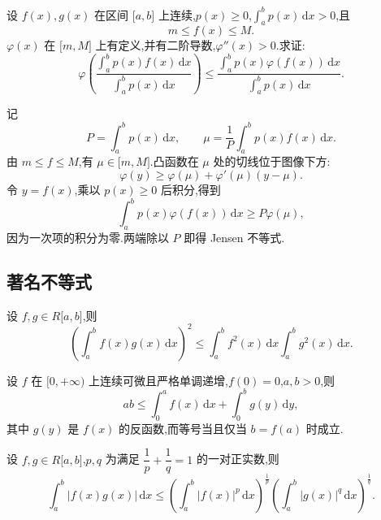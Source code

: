 \begin{example}[\markstar]
    设 $f(x),g(x)$ 在区间 $\lbrack a,b\rbrack$ 上连续,$p(x)\geq0$,$\displaystyle\int_a^bp(x)\,\mathrm{d}x>0$,且
    \[
        m\leq f(x)\leq M.
    \]
    $\varphi(x)$ 在 $\lbrack m,M\rbrack$ 上有定义,并有二阶导数,$\varphi''(x)>0$.求证:
    \[
        \varphi\left(
        \dfrac{\displaystyle\int_a^bp(x)f(x)\,\mathrm{d}x}
            {\displaystyle\int_a^bp(x)\,\mathrm{d}x}
        \right)
        \leq
        \dfrac{\displaystyle\int_a^bp(x)\varphi(f(x))\,\mathrm{d}x}
        {\displaystyle\int_a^bp(x)\,\mathrm{d}x}.
    \]
\end{example}
\exampleblank

\begin{solution}
    记
    \[
        P=\int_a^bp(x)\,\mathrm{d}x,
        \qquad
        \mu=\dfrac{1}{P}\int_a^bp(x)f(x)\,\mathrm{d}x.
    \]
    由 $m\leq f\leq M$,有 $\mu\in\lbrack m,M\rbrack$.凸函数在 $\mu$ 处的切线位于图像下方:
    \[
        \varphi(y)\geq\varphi(\mu)+\varphi'(\mu)(y-\mu).
    \]
    令 $y=f(x)$,乘以 $p(x)\geq0$ 后积分,得到
    \[
        \displaystyle\int_a^bp(x)\varphi(f(x))\,\mathrm{d}x
        \geq P\varphi(\mu),
    \]
    因为一次项的积分为零.两端除以 $P$ 即得 Jensen 不等式.
\end{solution}



\subsection{著名不等式}

\begin{theorem}
    设 $f,g\in R\lbrack a,b\rbrack$,则
    \[
        \left(\int_a^bf(x)g(x)\,\mathrm{d}x\right)^2
        \leq\int_a^bf^2(x)\,\mathrm{d}x\int_a^bg^2(x)\,\mathrm{d}x.
    \]
\end{theorem}

\begin{theorem}
    设 $f$ 在 $\lbrack 0,+\infty)$ 上连续可微且严格单调递增,$f(0)=0$,$a,b>0$,则
    \[
        ab\leq\int_0^af(x)\,\mathrm{d}x+\int_0^bg(y)\,\mathrm{d}y,
    \]
    其中 $g(y)$ 是 $f(x)$ 的反函数,而等号当且仅当 $b=f(a)$ 时成立.
\end{theorem}

\begin{theorem}
    设 $f,g\in R\lbrack a,b\rbrack$,$p,q$ 为满足 $\dfrac{1}{p}+\dfrac{1}{q}=1$ 的一对正实数,则
    \[
        \displaystyle\int_a^b|f(x)g(x)|\,\mathrm{d}x
        \leq
        \left(\int_a^b|f(x)|^p\,\mathrm{d}x\right)^{\frac{1}{p}}
        \left(\int_a^b|g(x)|^q\,\mathrm{d}x\right)^{\frac{1}{q}}.
    \]
\end{theorem}

